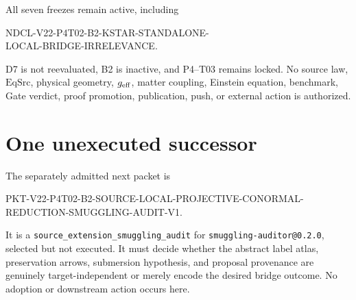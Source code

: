\documentclass[11pt]{article}
\begin{document}
All seven freezes remain active, including
\begin{center}
\small\ttfamily
NDCL-V22-P4T02-B2-KSTAR-STANDALONE-\\
LOCAL-BRIDGE-IRRELEVANCE.
\end{center}
D7 is not reevaluated, B2 is inactive, and P4--T03 remains locked.  No source
law, $\mathrm{EqSrc}$, physical geometry, $g_{\rm eff}$, matter coupling,
Einstein equation, benchmark, Gate verdict, proof promotion, publication,
push, or external action is authorized.

\section{One unexecuted successor}

The separately admitted next packet is
\begin{center}
\small\ttfamily
PKT-V22-P4T02-B2-SOURCE-LOCAL-PROJECTIVE-CONORMAL-\\
REDUCTION-SMUGGLING-AUDIT-V1.
\end{center}
It is a \texttt{source\_extension\_smuggling\_audit} for
\texttt{smuggling-auditor@0.2.0}, selected but not executed.  It must decide
whether the abstract label atlas, preservation arrows, submersion hypothesis,
and proposal provenance are genuinely target-independent or merely encode the
desired bridge outcome.  No adoption or downstream action occurs here.
\end{document}
